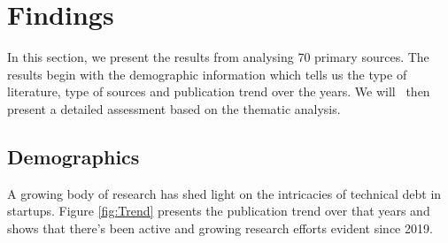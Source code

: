 \section{Findings}\label{Sec:Results}
In this section, we present the results from analysing 70 primary sources.
The results begin with the demographic information which tells us the type of literature, type of sources and publication trend over the years.
We will~
then present a detailed assessment based on the thematic analysis.

\subsection{Demographics}
A growing body of research has shed light on the intricacies of technical debt in startups.
Figure \ref{fig:Trend} presents the publication trend over that years and shows that there's been active and growing research efforts evident since 2019.


